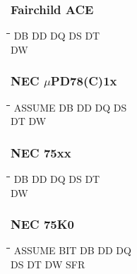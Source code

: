 \subsubsection{Fairchild ACE}
{\tt\begin{tabbing}
\hspace{3cm}\=\hspace{3cm}\=\hspace{3cm}\=\hspace{3cm}\=\kill
DB          \> DD          \> DQ          \> DS         \> DT \\
DW \\
\end{tabbing}}

\subsubsection{NEC $\mu$PD78(C)1x}
{\tt\begin{tabbing}
\hspace{3cm}\=\hspace{3cm}\=\hspace{3cm}\=\hspace{3cm}\=\kill
ASSUME     \> DB          \> DD          \> DQ          \> DS \\
DT         \> DW \\
\end{tabbing}}

\subsubsection{NEC 75xx}
{\tt\begin{tabbing}
\hspace{3cm}\=\hspace{3cm}\=\hspace{3cm}\=\hspace{3cm}\=\kill
DB         \> DD          \> DQ          \>DS           \> DT \\
DW \\
\end{tabbing}}

\subsubsection{NEC 75K0}
{\tt\begin{tabbing}
\hspace{3cm}\=\hspace{3cm}\=\hspace{3cm}\=\hspace{3cm}\=\kill
ASSUME     \> BIT         \> DB          \> DD          \> DQ \\
DS         \> DT          \> DW          \> SFR \\
\end{tabbing}}

